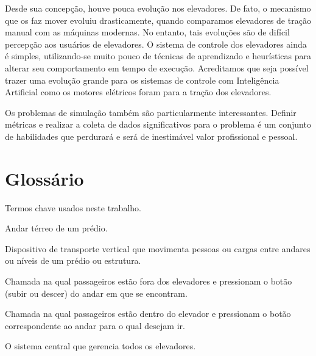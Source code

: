 Desde sua concepção, houve pouca evolução nos elevadores. De fato, o mecanismo que os faz mover evoluiu drasticamente, quando comparamos elevadores de tração manual com as máquinas modernas. No entanto, tais evoluções são de difícil percepção aos usuários de elevadores. O sistema de controle dos elevadores ainda é simples, utilizando-se muito pouco de técnicas de aprendizado e heurísticas para alterar seu comportamento em tempo de execução. Acreditamos que seja possível trazer uma evolução grande para os sistemas de controle com Inteligência Artificial como os motores elétricos foram para a tração dos elevadores.

Os problemas de simulação também são particularmente interessantes. Definir métricas e realizar a coleta de dados significativos para o problema é um conjunto de habilidades que perdurará e será de inestimável valor profissional e pessoal.

\section{Glossário}

Termos chave usados neste trabalho.

\begin{description}[leftmargin=!,labelwidth=\widthof{\bfseries Sistema de Controle}]
  \item[Lobby]                Andar térreo de um prédio.
  \item[Elevador]             Dispositivo de transporte vertical que movimenta pessoas ou cargas entre andares ou níveis de um prédio ou estrutura.
  \item[pickup call]          Chamada na qual passageiros estão fora dos elevadores e pressionam o botão (subir ou descer) do andar em que se encontram.
  \item[cabin call]           Chamada na qual passageiros estão dentro do elevador e pressionam o botão correspondente ao andar para o qual desejam ir.
  \item[Sistema de Controle]  O sistema central que gerencia todos os elevadores.
\end{description}